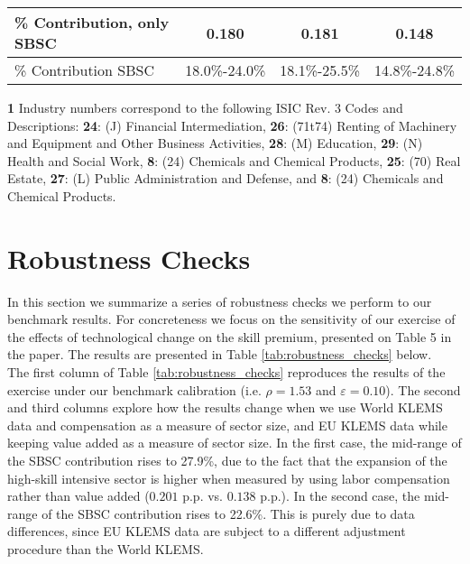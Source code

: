 \documentclass[10pt]{article}
\begin{document}
\begin{table}[!h]
\begin{threepartable}
{\begin{tabular}{l|c|cc}
\% Contribution, only SBSC                          & 0.180                 & 0.181                      & 0.148                           \\ \hline
\% Contribution SBSC                                & 18.0\%-24.0\%         & 18.1\%-25.5\%              & 14.8\%-24.8\%                   \\ \hline \hline
\end{tabular}%
}
\begin{tablenotes} \scriptsize
\item{\textbf{1}}  Industry numbers correspond to the following ISIC Rev. 3 Codes and Descriptions: \textbf{24}: (J) Financial Intermediation, \textbf{26}: (71t74) Renting of Machinery and Equipment and Other Business Activities, \textbf{28}: (M) Education, \textbf{29}: (N) Health and Social Work, \textbf{8}: (24) Chemicals and Chemical Products, \textbf{25}: (70) Real Estate, \textbf{27}: (L) Public Administration and Defense, and \textbf{8}: (24) Chemicals and Chemical Products.\\
\end{tablenotes}
\end{threepartable}
\end{table}


\clearpage
\newpage
\section{Robustness Checks}
In this section we summarize a series of robustness checks we perform to our benchmark results. For concreteness we focus on the sensitivity of our exercise of the effects of technological change on the skill premium, presented on Table 5 in the paper. The results are presented in Table \ref{tab:robustness_checks} below.\\

The first column of Table \ref{tab:robustness_checks} reproduces the results of the exercise under our benchmark calibration (i.e. $\rho = 1.53$ and $\varepsilon=0.10$). The second and third columns explore how the results change when we use World KLEMS data and compensation as a measure of sector size, and EU KLEMS data while keeping value added as a measure of sector size. In the first case, the mid-range of the SBSC contribution rises to 27.9\%, due to the fact that the expansion of the high-skill intensive sector is higher when measured by using labor compensation rather than value added ($0.201$ p.p. vs. $0.138$ p.p.). In the second case, the mid-range of the SBSC contribution rises to 22.6\%. This is purely due to data differences, since EU KLEMS data are subject to a different adjustment procedure than the World KLEMS.\\
\end{document}
